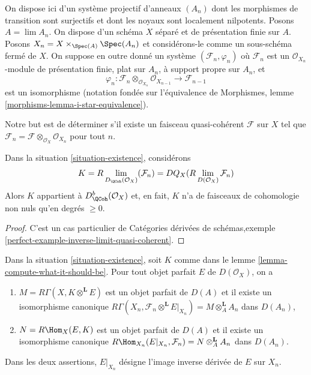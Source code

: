 \begin{situation}
\label{situation-existence}
On dispose ici d'un système projectif d'anneaux $(A_n)$ dont les morphismes de transition
sont surjectifs et dont les noyaux sont localement nilpotents. Posons $A = \lim A_n$. On dispose d'un
schéma $X$ séparé et de présentation finie sur $A$.
Posons $X_n = X \times_{\Spec(A)} \Spec(A_n)$ et
considérons-le comme un sous-schéma fermé de $X$. On suppose en outre donné un système
$(\mathcal{F}_n, \varphi_n)$ où $\mathcal{F}_n$ est un
$\mathcal{O}_{X_n}$-module de présentation finie, plat sur $A_n$, à support propre sur $A_n$,
et
$$
\varphi_n :
\mathcal{F}_n \otimes_{\mathcal{O}_{X_n}} \mathcal{O}_{X_{n - 1}}
\longrightarrow
\mathcal{F}_{n - 1}
$$
est un isomorphisme (notation fondée sur l'équivalence de
Morphismes, lemme \ref{morphisms-lemma-i-star-equivalence}).
\end{situation}

\noindent
Notre but est de déterminer s'il existe un faisceau quasi-cohérent $\mathcal{F}$
sur $X$ tel que
$\mathcal{F}_n = \mathcal{F} \otimes_{\mathcal{O}_X} \mathcal{O}_{X_n}$
pour tout $n$.

\begin{lemma}
\label{lemma-compute-what-it-should-be}
Dans la situation \ref{situation-existence}, considérons
$$
K = R\lim_{D_\QCoh(\mathcal{O}_X)}(\mathcal{F}_n) =
DQ_X(R\lim_{D(\mathcal{O}_X)}\mathcal{F}_n)
$$
Alors $K$ appartient à $D^b_{\QCoh}(\mathcal{O}_X)$ et, en fait,
$K$ n'a de faisceaux de cohomologie non nuls qu'en degrés $\geq 0$.
\end{lemma}

\begin{proof}
C'est un cas particulier de
Catégories dérivées de schémas,\newline exemple
\ref{perfect-example-inverse-limit-quasi-coherent}.
\end{proof}

\begin{lemma}
\label{lemma-compute-against-perfect}
Dans la situation \ref{situation-existence}, soit $K$ comme dans le
lemme \ref{lemma-compute-what-it-should-be}. Pour tout
objet parfait $E$ de $D(\mathcal{O}_X)$, on a
\begin{enumerate}
\item $M = R\Gamma(X, K \otimes^\mathbf{L} E)$ est un objet parfait de $D(A)$
et il existe un isomorphisme canonique
$R\Gamma(X_n, \mathcal{F}_n \otimes^\mathbf{L} E|_{X_n}) =
M \otimes_A^\mathbf{L} A_n$
dans $D(A_n)$,
\item $N = R\Hom_X(E, K)$ est un objet parfait de $D(A)$
et il existe un isomorphisme canonique
$R\Hom_{X_n}(E|_{X_n}, \mathcal{F}_n) = N \otimes_A^\mathbf{L} A_n$
dans $D(A_n)$.
\end{enumerate}
Dans les deux assertions, $E|_{X_n}$ désigne l'image inverse dérivée
de $E$ sur $X_n$.
\end{lemma}

